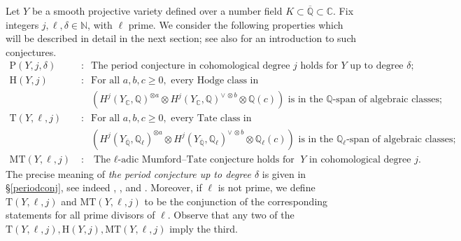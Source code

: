 \documentclass[10pt]{article}
\numberwithin{equation}{section}
\theoremstyle{plain}
\theoremstyle{definition}
\theoremstyle{remark}
\newcommand{\Qbar}{\overline{\mathbb{Q}}}
\newcommand{\Q}{\mathbb{Q}}
\begin{document}
Let $Y$ be a smooth projective variety defined over a number field $K \subset \overline{\mathbb{Q}} \subset \mathbb{C}$. Fix integers $j,\ell,\delta \in \mathbb{N}$, with $\ell$ prime. We consider the following properties which will be described in detail in the next section; see also \cite[Sec. 7]{zbMATH02128361} for an introduction to such conjectures.
\begin{align*}
%
\mathrm{P}(Y,j,\delta) \; &:\;\; \text{The period conjecture in cohomological degree $j$ holds for } Y \text{ up to degree } \delta; \\[0.5em]
%
\mathrm{H}(Y,j) \; &:\;\;
\text{For all } a,b,c \ge 0, \text{ every Hodge class in } \\
&\quad \left(H^j(Y_{\mathbb{C}},\mathbb{Q})^{\otimes a} \otimes H^j(Y_{\mathbb{C}},\mathbb{Q})^{\vee\,\otimes b} \otimes \mathbb{Q}(c) \right) 
\text{ is in the $\Q$-span of algebraic classes;} \\[0.5em]
%
\mathrm{T}(Y,\ell,j) \; &:\;\; \text{For all } a,b,c \ge 0, \text{ every Tate class in } \\
&\quad \left(H^j(Y_{\Qbar},\mathbb{Q}_\ell)^{\otimes a} \otimes H^j(Y_{\Qbar},\mathbb{Q}_\ell)^{\vee\,\otimes b} \otimes \mathbb{Q}_{\ell}(c) \right) 
\text{ is in the $\Q_\ell$-span of algebraic classes;} \\[0.5em]
%
\mathrm{MT}(Y,\ell,j) \; &:\;\; \text{The $\ell$-adic Mumford--Tate conjecture holds for } Y \text{ in cohomological degree } j.
\end{align*}
 The precise meaning of \emph{the period conjecture up to degree $\delta$} is given in \S \ref{periodconj}, see indeed , , and . Moreover, if $\ell$ is not prime, we define $\mathrm{T}(Y,\ell,j)$ and $\mathrm{MT}(Y,\ell,j)$ to be the conjunction of the corresponding statements for all prime divisors of $\ell$. Observe that any two of the $\mathrm{T}(Y,\ell,j), \mathrm{H}(Y,j), \mathrm{MT}(Y,\ell,j)  $ imply the third.
\end{document}
